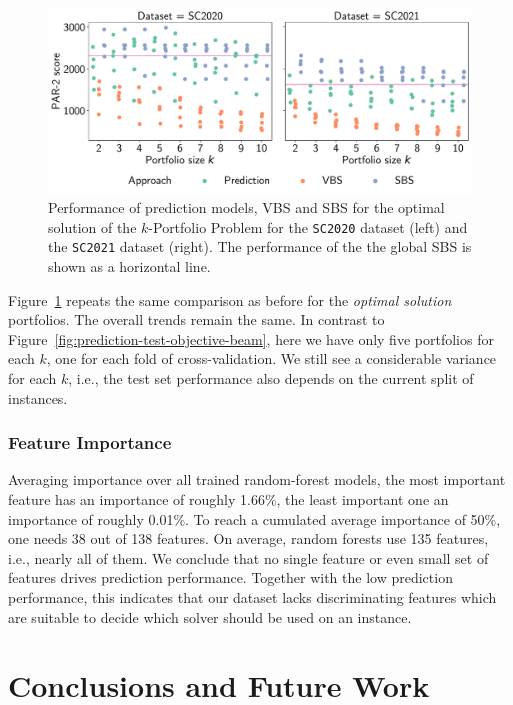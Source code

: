\documentclass[runningheads]{llncs}
\begin{document}
\begin{figure}[htb]
	\centering
	\includegraphics[width=\columnwidth]{plots/prediction-test-objective-optimal.pdf}
	\caption{
		Performance of prediction models, VBS and SBS for the optimal solution of the $k$-Portfolio Problem for the \texttt{SC2020} dataset (left) and the \texttt{SC2021} dataset (right).
		The performance of the the global SBS is shown as a horizontal line.
	}
	\label{fig:prediction-test-objective-optimal}
\end{figure}

Figure~\ref{fig:prediction-test-objective-optimal} repeats the same comparison as before for the \emph{optimal solution} portfolios.
The overall trends remain the same.
In contrast to Figure~\ref{fig:prediction-test-objective-beam}, here we have only five portfolios for each $k$, one for each fold of cross-validation.
We still see a considerable variance for each $k$, i.e., the test set performance also depends on the current split of instances.

\subsubsection{Feature Importance}

Averaging importance over all trained random-forest models, the most important feature has an importance of roughly 1.66\%, the least important one an importance of roughly 0.01\%.
To reach a cumulated average importance of 50\%, one needs 38 out of 138 features.
On average, random forests use 135 features, i.e., nearly all of them.
We conclude that no single feature or even small set of features drives prediction performance.
Together with the low prediction performance, this indicates that our dataset lacks discriminating features which are suitable to decide which solver should be used on an instance.

\section{Conclusions and Future Work}
\label{sec:conclusion}
\end{document}
